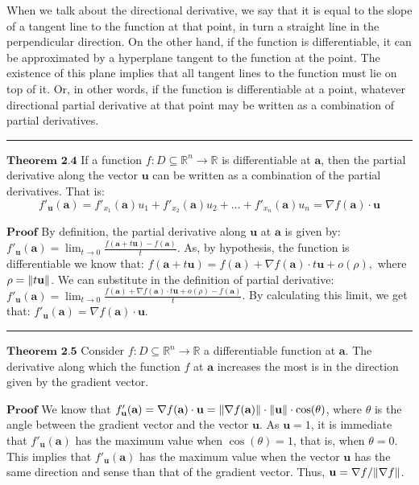 \documentclass[0pt, a4paper]{article}
\begin{document}
When we talk about the directional derivative, we say that it is equal to the slope of a tangent line to the function at that point, in turn a straight line in the perpendicular direction. On the other hand, if the function is differentiable, it can be approximated by a hyperplane tangent to the function at the point. The existence of this plane implies that all tangent lines to the function must lie on top of it. Or, in other words, if the function is differentiable at a point, whatever directional partial derivative at that point may be written as a combination of partial derivatives.

\noindent\rule{\textwidth}{1pt}

$\textbf{Theorem 2.4}$ If a function $f:D\subseteq\mathbb{R}^n\to\mathbb{R}$ is differentiable at $\textbf{a}$, then the partial derivative along the vector $\textbf{u}$ can be written as a combination of the partial derivatives. That is:
$$f'_\textbf{u}(\textbf{a})=f'_{x_1}(\textbf{a})u_1+f'_{x_2}(\textbf{a})u_2+\dots+f'_{x_n}(\textbf{a})u_n=\nabla f(\textbf{a})\cdot\textbf{u}$$

$\textbf{Proof}$ By definition, the partial derivative along $\textbf{u}$ at $\textbf{a}$ is given by: $f'_\textbf{u}(\textbf{a})=\lim_{t\to0}\frac{f(\textbf{a}+t\textbf{u})-f(\textbf{a})}{t}$. As, by hypothesis, the function is differentiable we know that: $ f(\textbf{a}+t\textbf{u}) = f(\textbf{a})+\nabla f(\textbf{a})\cdot t\textbf{u}+o(\rho),$ where $\rho=\norm{t\textbf{u}}$. We can substitute in the definition of partial derivative: $ f'_\textbf{u}(\textbf{a})= \lim_{t\to0}\frac{f(\textbf{a})+\nabla f(\textbf{a})\cdot t\textbf{u}+o(\rho)-f(\textbf{a})}{t}$. By calculating this limit, we get that: $f'_\textbf{u}(\textbf{a})=\nabla f(\textbf{a})\cdot\textbf{u}$.

\noindent\rule{\textwidth}{1pt}

$\textbf{Theorem 2.5}$ Consider $f:D\subseteq\mathbb{R}^n\to\mathbb{R}$ a differentiable function at $\textbf{a}$. The derivative along which the function $f$ at $\textbf{a}$ increases the most is in the direction given by the gradient vector.

$\textbf{Proof}$ We know that $f'_\textbf{u}(\textbf{a})=\nabla f(\textbf{a})\cdot\textbf{u}=\norm{\nabla f(\textbf{a})}\cdot\norm{\textbf{u}}\cdot\cos(\theta)$, where $\theta$ is the angle between the gradient vector and the vector $\textbf{u}$. As $\textbf{u}=1$, it is immediate that $f'_\textbf{u}(\textbf{a})$ has the maximum value when $\cos(\theta)=1$, that is, when $\theta=0$. This implies that $f'_\textbf{u}(\textbf{a})$ has the maximum value when the vector $\textbf{u}$ has the same direction and sense than that of the gradient vector. Thus, $\textbf{u}=\nabla f/\norm{\nabla f}$.
\end{document}

